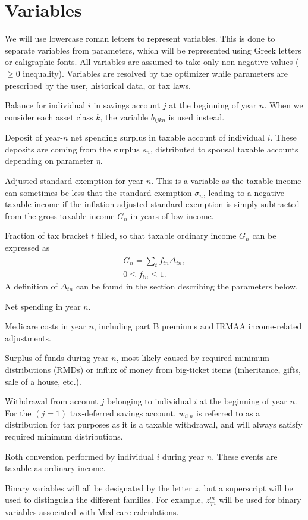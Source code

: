 \documentclass{report}[fleqn,11pt]
\begin{document}
\section{Variables}
We will use lowercase roman letters to represent variables. This is done to separate
variables from parameters, which will be represented using
Greek letters or caligraphic fonts. All variables are assumed
to take only non-negative values ($\ge 0$ inequality). Variables are resolved by the optimizer
while parameters are prescribed by the user, historical data, or tax laws.
\begin{description}[leftmargin=4em,style=multiline]
\item [$b_{ijn}$]
	Balance for individual $i$ in savings account $j$ at the beginning of year $n$.
	When we consider each asset class $k$, the variable $b_{ijkn}$ is used instead.
\item [$d_{in}$]
	Deposit of year-$n$ net spending surplus in taxable account of individual $i$.
	These deposits are coming from the surplus $s_n$, distributed to
	spousal taxable accounts depending on parameter $\eta$.
\item [$e_{n}$]
	Adjusted standard exemption for year $n$. This is a variable as the taxable income can
        sometimes be less that the standard exemption $\bar{\sigma}_n$, leading to a
	negative taxable income if the inflation-adjusted standard exemption is simply subtracted
	from the gross taxable income $G_n$ in years of low income.
\item [$f_{t n}$]
	Fraction of tax bracket $t$ filled, so that taxable ordinary income $G_n$ can be expressed as
	\begin{eqnarray}
		\label{Eq:Tx1}
		G_n = \sum_t f_{t n}\bar{\Delta}_{t n},\\
		0 \leq f_{t n} \leq 1.
	\end{eqnarray}
		A definition of $\Delta_{tn}$ can be found in the section describing the parameters below. 
\item [$g_n$]
	Net spending in year $n$.
\item [$m_n$]
	Medicare costs in year $n$, including part B premiums and IRMAA income-related adjustments.
\item [$s_{n}$]
	Surplus of funds during year $n$, most likely caused by required minimum distributions (RMDs)
	or influx of money from big-ticket items (inheritance, gifts, sale of a house, etc.).
\item [$w_{ijn}$]
	Withdrawal from account $j$ belonging to individual $i$ at the beginning of year $n$.
	For the $(j=1)$ tax-deferred savings account, $w_{i1n}$ is referred to as a distribution for
	tax purposes as it is a taxable withdrawal, and will always satisfy required minimum distributions.
\item [$x_{in}$]
	Roth conversion performed by individual $i$ during year $n$.
	These events are taxable as ordinary income.
\item [$z_{*}^*$]
	Binary variables will all be designated by the letter $z$, but a superscript will be
	used to distinguish the different families. For example, $z_{qn}^m$ will be used
	for binary variables associated with Medicare calculations.
\end{description}
\end{document}
